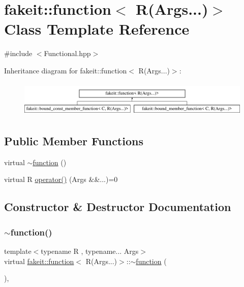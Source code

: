 \hypertarget{classfakeit_1_1function_3_01R_07Args_8_8_8_08_4}{}\section{fakeit\+::function$<$ R(Args...)$>$ Class Template Reference}
\label{classfakeit_1_1function_3_01R_07Args_8_8_8_08_4}


{\ttfamily \#include $<$Functional.\+hpp$>$}

Inheritance diagram for fakeit\+::function$<$ R(Args...)$>$\+:\begin{figure}[H]
\begin{center}
\leavevmode
\includegraphics[height=1.733746cm]{classfakeit_1_1function_3_01R_07Args_8_8_8_08_4}
\end{center}
\end{figure}
\subsection*{Public Member Functions}
\begin{DoxyCompactItemize}
\item 
virtual \mbox{\hyperlink{classfakeit_1_1function_3_01R_07Args_8_8_8_08_4_ab4d51e45c132c1ea94c28a81aaeb4de0}{$\sim$function}} ()
\item 
virtual R \mbox{\hyperlink{classfakeit_1_1function_3_01R_07Args_8_8_8_08_4_ab6d82373650cb3eb6fa03fcdecfd8d13}{operator()}} (Args \&\&...)=0
\end{DoxyCompactItemize}


\subsection{Constructor \& Destructor Documentation}
\mbox{\label{classfakeit_1_1function_3_01R_07Args_8_8_8_08_4_ab4d51e45c132c1ea94c28a81aaeb4de0}} 
\subsubsection{\texorpdfstring{$\sim$function()}{~function()}}
{\footnotesize\ttfamily template$<$typename R , typename... Args$>$ \\
virtual \mbox{\hyperlink{classfakeit_1_1function}{fakeit\+::function}}$<$ R(Args...)$>$\+::$\sim$\mbox{\hyperlink{classfakeit_1_1function}{function}} (\begin{DoxyParamCaption}{ }\end{DoxyParamCaption})\hspace{0.3cm}{\ttfamily [inline]}, {\ttfamily [virtual]}}



